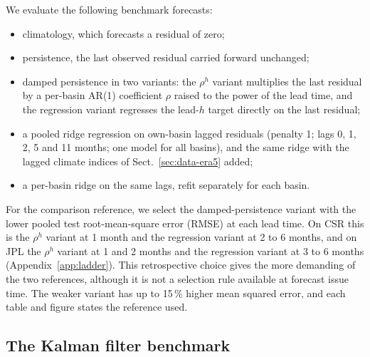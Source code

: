 \documentclass[hess, manuscript]{copernicus}
\begin{document}
We evaluate the following benchmark forecasts:
\begin{itemize}
\item climatology, which forecasts a residual of zero;
\item persistence, the last observed residual carried forward unchanged;
\item damped persistence in two variants: the $\rho^{h}$ variant
multiplies the last residual by a per-basin AR(1) coefficient $\rho$ raised
to the power of the lead time, and the regression variant regresses the
lead-$h$ target directly on the last residual;
\item a pooled ridge regression on own-basin lagged residuals (penalty 1;
lags 0, 1, 2, 5 and 11 months; one model for all basins), and the same
ridge with the lagged climate indices of Sect.~\ref{sec:data-era5} added;
\item a per-basin ridge on the same lags, refit separately for each basin.
\end{itemize}
For the comparison reference, we select the damped-persistence variant
with the lower pooled test root-mean-square error (RMSE) at each
lead time. On CSR this is the $\rho^{h}$ variant at 1 month and the regression
variant at 2 to 6 months, and on JPL the $\rho^{h}$ variant at 1 and 2 months
and the regression variant at 3 to 6 months (Appendix~\ref{app:ladder}).
This retrospective choice gives the more demanding of the two
references, although it is not a selection rule available at forecast
issue time. The weaker variant has up to 15\,\% higher mean squared
error, and each table and figure states the reference used.

\subsection{The Kalman filter benchmark}
\label{sec:methods-kalman}
\end{document}
